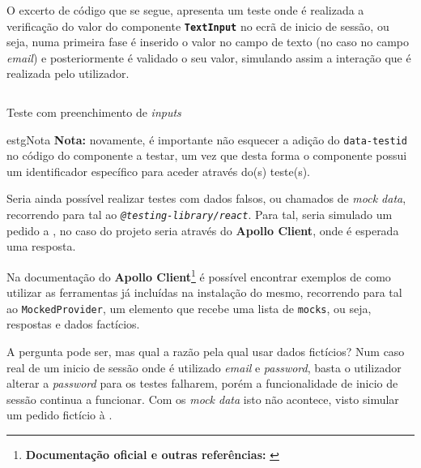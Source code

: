 O excerto de código que se segue, apresenta um teste onde é realizada a verificação do valor do componente \textbf{\texttt{TextInput}} no ecrã de inicio de sessão, ou seja, numa primeira fase é inserido o valor no campo de texto (no caso no campo \textit{email}) e posteriormente é validado o seu valor, simulando assim a interação que é realizada pelo utilizador.

\begin{longlisting}
	\inputminted[]{jsx}{code/tests/insert-text-input.test.tsx}
	\caption{Teste com preenchimento de \textit{inputs}}
\end{longlisting}

\begin{mybox}{estg}{Nota}
	\textbf{Nota:} novamente, é importante não esquecer a adição do \texttt{data-testid} no código do componente a testar, um vez que desta forma o componente possui um identificador específico para aceder através do(s) teste(s).
\end{mybox}

Seria ainda possível realizar testes com dados falsos, ou chamados de \textit{mock data}, recorrendo para tal ao \textit{ \texttt{@testing-library/react}}. Para tal, seria simulado um pedido a \textbf{}, no caso do projeto seria através do \textbf{Apollo Client}, onde é esperada uma resposta.

Na documentação do \textbf{Apollo Client}\footnote{\textbf{Documentação oficial e outras referências:} \cite{apolloTestsDocs,mockingApolloTesting,apolloTest,mockingData,mockingGraphql}} é possível encontrar exemplos de como utilizar as ferramentas já incluídas na instalação do mesmo, recorrendo para tal ao \texttt{MockedProvider}, um elemento que recebe uma lista de \texttt{mocks}, ou seja, respostas e dados factícios.

A pergunta pode ser, mas qual a razão pela qual usar dados fictícios? Num caso real de um inicio de sessão onde é utilizado \textit{email} e \textit{password}, basta o utilizador alterar a \textit{password} para os testes falharem, porém a funcionalidade de inicio de sessão continua a funcionar. Com os \textit{mock data} isto não acontece, visto simular um pedido fictício à \textbf{}.